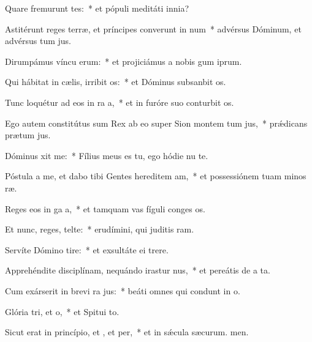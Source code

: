 \item Quare fremurunt tes:~* et pópuli meditáti  innia?
\item Astitérunt reges terræ, et príncipes converunt in num~* advérsus Dóminum, et advérsus tum jus.
\item Dirumpámus víncu erum:~* et projiciámus a nobis gum iprum.
\item Qui hábitat in cælis, irribit os:~* et Dóminus subsanbit os.
\item Tunc loquétur ad eos in ra a,~* et in furóre suo conturbit os.
\item Ego autem constitútus sum Rex ab eo super Sion montem tum jus,~* prǽdicans prætum jus.
\item Dóminus xit  me:~* Fílius meus es tu, ego hódie nu te.
\item Póstula a me, et dabo tibi Gentes hereditem am,~* et possessiónem tuam minos ræ.
\item Reges eos in ga a,~* et tamquam vas fíguli conges os.
\item Et nunc, reges, telte:~* erudímini, qui juditis ram.
\item Servíte Dómino  tire:~* et exsultáte ei  trere.
\item Apprehéndite disciplínam, nequándo irastur nus,~* et pereátis de a ta.
\item Cum exárserit in brevi ra jus:~* beáti omnes qui condunt in o.
\item Glória tri, et o,~* et Spitui to.
\item Sicut erat in princípio, et , et per,~* et in sǽcula sæcurum. men.
